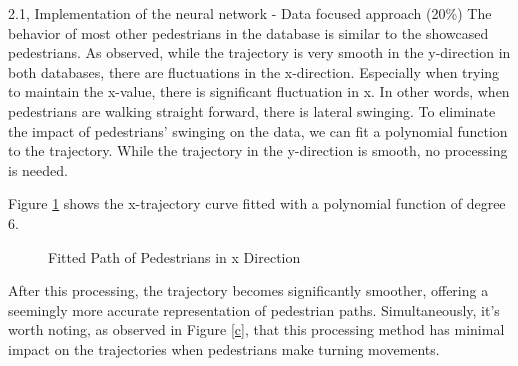 \begin{task}{2.1, Implementation of the neural network - Data focused approach (20\%)}
The behavior of most other pedestrians in the database is similar to the showcased pedestrians. As observed, while the trajectory is very smooth in the y-direction in both databases, there are fluctuations in the x-direction. Especially when trying to maintain the x-value, there is significant fluctuation in x. In other words, when pedestrians are walking straight forward, there is lateral swinging. To eliminate the impact of pedestrians' swinging on the data, we can fit a polynomial function to the trajectory. While the trajectory in the y-direction is smooth, no processing is needed.

Figure \ref{pedestrain path fit} shows the x-trajectory curve fitted with a polynomial function of degree 6.
\begin{figure}[H]
\centering
{}
\caption{Fitted Path of Pedestrians in x Direction}
\label{pedestrain path fit}
\end{figure}

After this processing, the trajectory becomes significantly smoother, offering a seemingly more accurate representation of pedestrian paths. Simultaneously, it's worth noting, as observed in Figure \ref{c}, that this processing method has minimal impact on the trajectories when pedestrians make turning movements.



\end{task}
